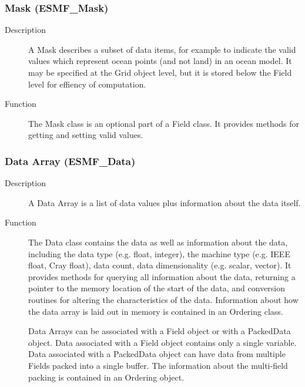 \subsubsection{Mask (ESMF\_Mask)}
\label{sec:mask} 
\begin{description}
\item [Description] A Mask describes a subset of data items, for example to indicate
the valid values which represent ocean points (and not land) in an ocean model.  
It may be specified at the Grid object level, but it is stored below the Field level 
for effiency of computation.
\item [Function] The Mask class is an optional part of a Field class.  It provides methods
for getting and setting valid values.
\end{description}

\subsubsection{Data Array (ESMF\_Data)}
\label{sec:dataarray} 
\begin{description}
\item [Description] A Data Array is a list of data values plus information about
the data itself.
\item [Function] The Data class contains the data as well as information about the data,
including the data type (e.g. float,
integer), the machine type (e.g. IEEE float, Cray float), data count, data dimensionality
(e.g. scalar, vector).  It provides methods for querying all information about the data,
returning a pointer to the memory location of the start of the data, and conversion routines
for altering the characteristics of the data.  Information about how the data array is laid
out in memory is contained in an Ordering class.

Data Arrays can be associated with a Field object or with a PackedData object.
Data associated with a Field object contains only a single variable.  Data associated
with a PackedData object can have data from multiple Fields packed into a single
buffer.  The information about the multi-field packing is contained in an
Ordering object.
\end{description}

